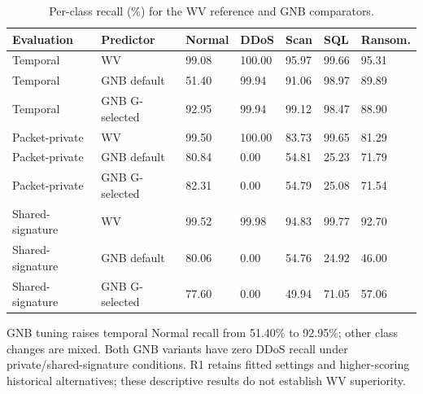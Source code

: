 \documentclass[10pt,a4paper]{article}
\begin{document}
\begin{table}[H]\centering\small\setlength{\tabcolsep}{3pt}\renewcommand{\arraystretch}{1.1}

\caption{Per-class recall (\%) for the WV reference and GNB comparators.}\label{sup:comparators}

\begin{tabular}{L{0.17\dimexpr{}\tabcolsep\relax}L{0.19\dimexpr{}\tabcolsep\relax}L{0.125\dimexpr{}\tabcolsep\relax}L{0.125\dimexpr{}\tabcolsep\relax}L{0.125\dimexpr{}\tabcolsep\relax}L{0.125\dimexpr{}\tabcolsep\relax}L{0.14\dimexpr{}\tabcolsep\relax}}\toprule

Evaluation & Predictor & Normal & DDoS & Scan & SQL & Ransom.\\\midrule

Temporal & WV & 99.08 & 100.00 & 95.97 & 99.66 & 95.31\\

Temporal & GNB default & 51.40 & 99.94 & 91.06 & 98.97 & 89.89\\

Temporal & GNB G-selected & 92.95 & 99.94 & 99.12 & 98.47 & 88.90\\

Packet-private & WV & 99.50 & 100.00 & 83.73 & 99.65 & 81.29\\

Packet-private & GNB default & 80.84 & 0.00 & 54.81 & 25.23 & 71.79\\

Packet-private & GNB G-selected & 82.31 & 0.00 & 54.79 & 25.08 & 71.54\\

Shared-signature & WV & 99.52 & 99.98 & 94.83 & 99.77 & 92.70\\

Shared-signature & GNB default & 80.06 & 0.00 & 54.76 & 24.92 & 46.00\\

Shared-signature & GNB G-selected & 77.60 & 0.00 & 49.94 & 71.05 & 57.06\\

\bottomrule\end{tabular}\end{table}

GNB tuning raises temporal Normal recall from 51.40\% to 92.95\%; other class changes are mixed. Both GNB variants have zero DDoS recall under private/shared-signature conditions. R1 retains fitted settings and higher-scoring historical alternatives; these descriptive results do not establish WV superiority.
\end{document}
